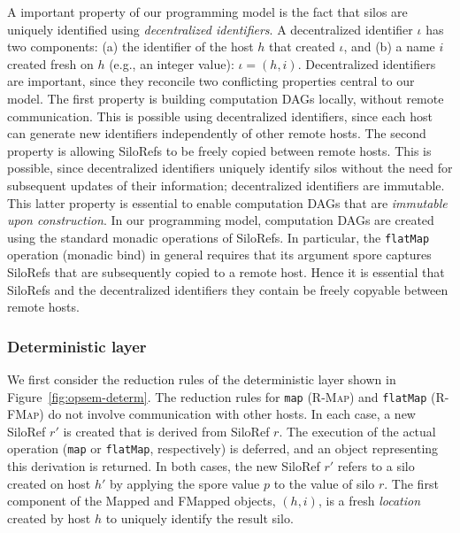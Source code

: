 \documentclass[preprint]{sigplanconf}
\theoremstyle{definition}
\theoremstyle{definition}
\begin{document}
A important property of our programming model is the fact that silos are uniquely identified using \emph{decentralized identifiers}. A decentralized identifier $\iota$ has two components: (a) the identifier of the host $h$ that created $\iota$, and (b) a name $i$ created fresh on $h$ (e.g., an integer value): $\iota = (h, i)$. Decentralized identifiers are important, since they reconcile two conflicting properties central to our model. The first property is building computation DAGs locally, without remote communication. This is possible using decentralized identifiers, since each host can generate new identifiers independently of other remote hosts. The second property is allowing SiloRefs to be freely copied between remote hosts. This is possible, since decentralized identifiers uniquely identify silos without the need for subsequent updates of their information; decentralized identifiers are immutable. This latter property is essential to enable computation DAGs that are \emph{immutable upon construction}. In our programming model, computation DAGs are created using the standard monadic operations of SiloRefs. In particular, the \texttt{flatMap} operation (monadic bind) in general requires that its argument spore captures SiloRefs that are subsequently copied to a remote host. Hence it is essential that SiloRefs and the decentralized identifiers they contain be freely copyable between remote hosts.

\subsubsection{Deterministic layer}\label{sec:det-layer}

We first consider the reduction rules of the deterministic layer shown in Figure~\ref{fig:opsem-determ}. The reduction rules for \texttt{map} (\textsc{R-Map}) and \texttt{flatMap} (\textsc{R-FMap}) do not involve communication with other hosts. In each case, a new SiloRef $r'$ is created that is derived from SiloRef $r$. The execution of the actual operation (\texttt{map} or \texttt{flatMap}, respectively) is deferred, and an object representing this derivation is returned. In both cases, the new SiloRef $r'$ refers to a silo created on host $h'$ by applying the spore value $p$ to the value of silo $r$. The first component of the Mapped and FMapped objects, $(h, i)$, is a fresh \emph{location} created by host $h$ to uniquely identify the result silo.
\end{document}
